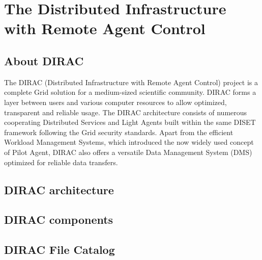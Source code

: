 \chapter{The Distributed Infrastructure with Remote Agent Control}

\section{About DIRAC}
The DIRAC (Distributed Infrastructure with Remote Agent Control) project is a complete Grid solution for a 
medium-sized scientific community. DIRAC forms a layer between users and various computer resources 
to allow optimized, transparent and reliable usage. The DIRAC architecture consists of numerous 
cooperating Distributed Services and Light Agents built within the same DISET framework following 
the Grid security standards. Apart from the efficient Workload Management Systems, which introduced
the now widely used concept of Pilot Agent, DIRAC also offers a versatile Data Management System (DMS) 
optimized for reliable data transfers.

\section{DIRAC architecture}

\section{DIRAC components}

\section{DIRAC File Catalog}
